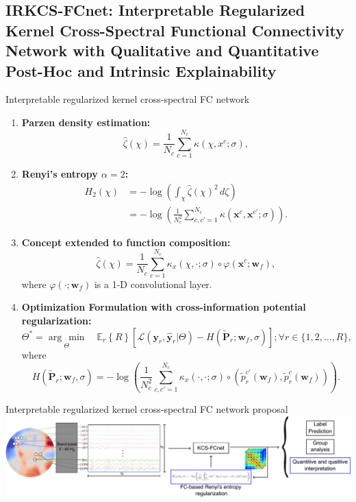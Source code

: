 \documentclass[aspectratio=169]{beamer}
\providecommand{\promeddd}[2]{\mathbb{E}_{#1}\!\left\{#2\right\}}%
\newcommand{\ve}[1]{\bm {#1}}
\newcommand{\mat}[1]{\bm {#1}}
\begin{document}
\subsection{IRKCS-FCnet: Interpretable Regularized Kernel Cross-Spectral Functional Connectivity Network with Qualitative and Quantitative Post-Hoc and Intrinsic Explainability}

\begin{frame}[allowframebreaks]{Interpretable regularized kernel cross-spectral FC network}
    \begin{enumerate}
        \item \textbf{Parzen density estimation:}
        \[
            \hat{\zeta}(\chi) = \frac{1}{N_c} \sum_{c=1}^{N_c} \kappa(\chi, x^c ; \sigma),
        \]
        \item \textbf{Renyi's entropy $\alpha=2$:}
        \[
            \begin{aligned}
                H_2(\chi) &= - \log \left( \int_{\chi} \hat{\zeta}(\chi)^2 \, d\zeta \right) \\
                          &= - \log \left( \frac{1}{N_{c}^{2}} \sum_{c,c'=1}^{N_c} \kappa ( \ve{x}^{c} , \ve{x}^{c'} ; \sigma ) \right).
            \end{aligned}
        \]
        \item \textbf{Concept extended to function composition:}
        \[
            \hat{\zeta}(\chi) = \frac{1}{N_c} \sum_{c=1}^{N_c}  \kappa_{x}(\chi, \cdot ; \sigma) \circ \varphi(\ve{x}^c; \ve{w}_f), 
        \]
        where $\varphi(\cdot; \ve{w}_f )$ is a 1-D convolutional layer.
        \item \textbf{Optimization Formulation with cross-information potential regularization:}
        \[
            \Theta^{*} = \underset{\Theta}{\arg\,\min} \quad \promeddd{r}{R} \left[ \mathcal{L}(\ve{y}_r, \hat{\ve{y}}_r | \Theta) - H(\tilde{\mat{P}}_r; \ve{w}_f, \sigma) \right]; \forall r \in \{1, 2, \dots, R\},
        \]
        where
        \[
            H(\tilde{\mat{P}}_r; \ve{w}_f, \sigma) = - \log \left( \frac{1}{N_c^2} \sum_{c, c'=1}^{N_c} \kappa_{x}(\cdot, \cdot; \sigma) \circ \left( \tilde{p}_r^{c'}(\ve{w}_f), \tilde{p}_r^{c}(\ve{w}_f) \right) \right).
        \]
    \end{enumerate}
\end{frame}


\begin{frame}{Interpretable regularized kernel cross-spectral FC network proposal}
    \centering
    \includegraphics[scale=0.55]{../Tesis_document/Figures/outline_and_contributions/contribution3.pdf}
\end{frame}
\end{document}
